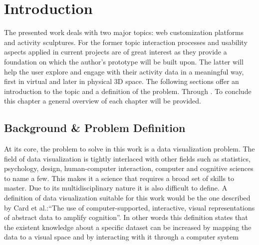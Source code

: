 \section{Introduction}
\label{ch:intro}
The presented work deals with two major topics: web customization platforms and
activity sculptures. For the former topic interaction processes and usability aspects
applied in current projects are of great interest as they provide a foundation on
which the author's prototype will be built upon. The latter will help the user
explore and engage with their activity data in a meaningful way, first in virtual and later in
physical 3D space. The following sections offer an introduction to the topic
and a definition of the problem. Through  . To conclude this chapter a general overview of each chapter will be
provided. 

\subsection{Background \& Problem Definition}
At its core, the problem to solve in this work is a data visualization problem.
The field of data visualization is tightly interlaced with other fields such as
statistics, psychology, design, human-computer interaction, computer and cognitive
sciences to name a few. This makes it a science that requires a broad set of
skills to master. Due to its multidisciplinary nature it is also difficult to
define. A definition of data visualization suitable for this work would be the
one described by Card et al.\cite{Card:1999:RIV:300679}:``The use of
computer-supported, interactive, visual representations of abstract data to
amplify cognition''. In other words this definition states that the existent knowledge about a
specific dataset can be increased by mapping the data to a visual space and
by interacting with it through a computer system 

